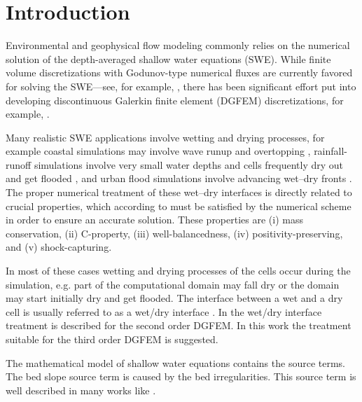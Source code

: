 \section{Introduction}

Environmental and geophysical flow modeling commonly relies on the
numerical solution of the depth-averaged shallow water equations
(SWE).  While finite volume discretizations with Godunov-type
numerical fluxes are currently favored for solving the SWE---see, for
example, \cite{Mugler2011, George2011, Lacasta2014, Hou2013,
  Simons2014, Echeverribar2019, Xia2019}, there has been significant
effort put into developing discontinuous Galerkin finite element
(DGFEM) discretizations, for example, \cite{CaviedesVoullieme2015,
  kesserwani2015, Kesserwani2019, Vater20151, Vater2019,
  CaviedesVoullieme2020, NavasMontilla2020}.

Many realistic SWE applications involve wetting and drying processes,
for example coastal simulations may involve wave runup and overtopping
\cite{Vater20151, Medeiros2013, Vater2019}, rainfall-runoff
simulations involve very small water depths and cells frequently dry
out and get flooded \cite{Simons2014, Lacasta2014, Xia2017}, and urban
flood simulations involve advancing wet--dry fronts \cite{George2011}.
The proper numerical treatment of these wet--dry interfaces is
directly related to crucial properties, which according to
\cite{CaviedesVoullieme2020} must be satisfied by the numerical scheme
in order to ensure an accurate solution.  These properties are (i)
mass conservation, (ii) C-property, (iii) well-balancedness, (iv)
positivity-preserving, and (v) shock-capturing.

In most of these cases wetting and drying processes of the cells occur
during the simulation, e.g. part of the computational domain may fall
dry or the domain may start initially dry and get flooded. The
interface between a wet and a dry cell is usually referred to as a
wet/dry interface \cite{Bollermann2013,Beisiegel2015}.  In
\cite{Vater20151} the wet/dry interface treatment is described for the
second order DGFEM. In this work the treatment suitable for the third
order DGFEM is suggested.

The mathematical model of shallow water equations contains the source
terms. The bed slope source term is caused by the bed
irregularities. This source term is well described in many works like
\cite{Ambati2007452,Ambati20071233,kesserwani2015,Beisiegel2015,Tassi2007998}.

